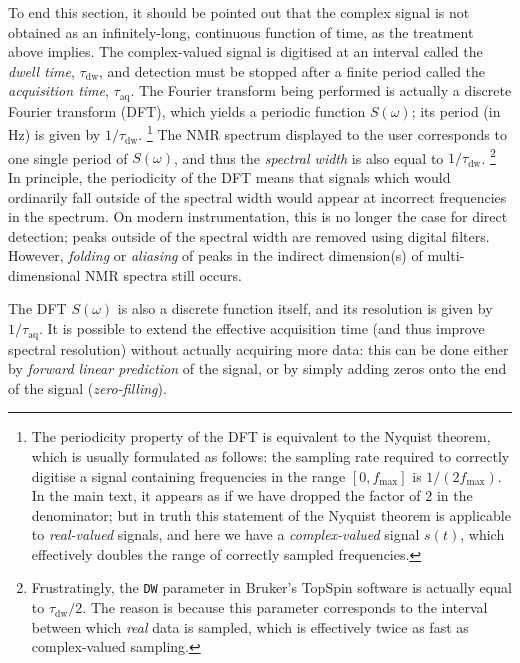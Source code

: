 To end this section, it should be pointed out that the complex signal is not obtained as an infinitely-long, continuous function of time, as the treatment above implies.
The complex-valued signal is digitised at an interval called the \textit{dwell time}, $\tau_\text{dw}$, and detection must be stopped after a finite period called the \textit{acquisition time}, $\tau_\text{aq}$.
The Fourier transform being performed is actually a discrete Fourier transform (DFT), which yields a periodic function $S(\omega)$; its period (in Hz) is given by $1/\tau_\text{dw}$.%
\footnote{The periodicity property of the DFT is equivalent to the Nyquist theorem, which is usually formulated as follows: the sampling rate required to correctly digitise a signal containing frequencies in the range $[0, f_\text{max}]$ is $1/(2f_\text{max})$. In the main text, it appears as if we have dropped the factor of $2$ in the denominator; but in truth this statement of the Nyquist theorem is applicable to \textit{real-valued} signals, and here we have a \textit{complex-valued} signal $s(t)$, which effectively doubles the range of correctly sampled frequencies.}
The NMR spectrum displayed to the user corresponds to one single period of $S(\omega)$, and thus the \textit{spectral width} is also equal to $1/\tau_\text{dw}$.%
\footnote{Frustratingly, the \texttt{DW} parameter in Bruker's TopSpin software is actually equal to $\tau_\text{dw}/2$. The reason is because this parameter corresponds to the interval between which \textit{real} data is sampled, which is effectively twice as fast as complex-valued sampling.}
In principle, the periodicity of the DFT means that signals which would ordinarily fall outside of the spectral width would appear at incorrect frequencies in the spectrum.\autocite{Turner1986JMR}
On modern instrumentation, this is no longer the case for direct detection; peaks outside of the spectral width are removed using digital filters.
However, \textit{folding} or \textit{aliasing} of peaks in the indirect dimension(s) of multi-dimensional NMR spectra still occurs.

The DFT $S(\omega)$ is also a discrete function itself, and its resolution is given by $1/\tau_\text{aq}$.
It is possible to extend the effective acquisition time (and thus improve spectral resolution) without actually acquiring more data: this can be done either by \textit{forward linear prediction} of the signal, or by simply adding zeros onto the end of the signal (\textit{zero-filling}).
